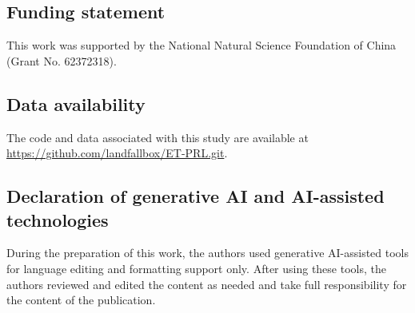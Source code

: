 \documentclass[preprint,12pt,number]{elsarticle}
\begin{document}
\subsection*{Funding statement}
This work was supported by the National Natural Science Foundation of China (Grant No. 62372318).

\subsection*{Data availability}
The code and data associated with this study are available at \url{https://github.com/landfallbox/ET-PRL.git}.

\subsection*{Declaration of generative AI and AI-assisted technologies}
During the preparation of this work, the authors used generative AI-assisted tools for language editing and formatting support only. After using these tools, the authors reviewed and edited the content as needed and take full responsibility for the content of the publication.
\end{document}
